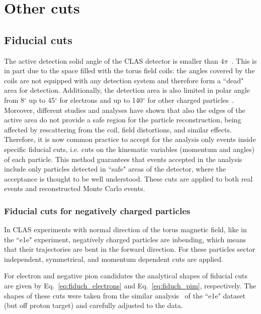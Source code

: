 \section{Other cuts}
\label{Sect:other_cuts}


\subsection{Fiducial cuts}
\label{Sect:fiduc} 

The active detection solid angle of the CLAS detector is smaller than $4\pi$~\cite{Mecking:2003zu}. This is in part due to the space filled with the torus field coils: the angles covered by the coils are not equipped with any detection system and therefore form a ``dead" area for detection. Additionally, the detection area is also limited in polar angle from 8$^{\circ}\mathrm{}$ up to 45$^{\circ}\mathrm{}$ for electrons and up to 140$^{\circ}\mathrm{}$ for other charged particles~\cite{Mecking:2003zu}. Moreover, different studies and analyses have shown that also the edges of the active area do not provide a safe region for the particle reconstruction, being affected by rescattering from the coil, field distortions, and similar effects. Therefore, it is now common practice to accept for the analysis only events inside specific fiducial cuts, i.e. cuts on the kinematic variables (momentum and angles) of each particle. This method guarantees that events accepted in the analysis include only particles detected in ``safe" areas of the detector, where the acceptance is thought to be well understood. These cuts are applied to both real events and reconstructed Monte Carlo events. 


\subsubsection{Fiducial cuts for negatively charged particles}
\label{Sect:fiduc_neg}

In CLAS experiments with normal direction of the torus magnetic field, like in the ``e1e" experiment, negatively charged particles are inbending, which means that their trajectories are bent in the forward direction. For these particles sector independent, symmetrical, and momentum dependent cuts are applied. 

For electron and negative pion candidates the analytical shapes of fiducial cuts are given by Eq.~\eqref{eq:fiduch_electrons} and Eq.~\eqref{eq:fiduch_pim}, respectively. The shapes of these cuts were taken from the similar analysis~\cite{Fed_an_note:2017} of the ``e1e" dataset (but off proton target) and carefully adjusted to the data.


